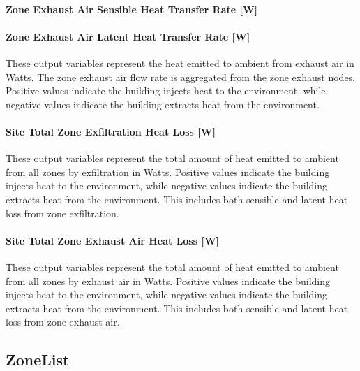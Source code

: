\paragraph{Zone Exhaust Air Sensible Heat Transfer Rate {[}W{]}}\label{zone-exhaust-sensible-heat-transfer-rate-w}

\paragraph{Zone Exhaust Air Latent Heat Transfer Rate {[}W{]}}\label{zone-exhaust-latent-heat-transfer-rate-w}

These output variables represent the heat emitted to ambient from exhaust air in Watts. The zone exhaust air flow rate is aggregated from the zone exhaust nodes. Positive values indicate the building injects heat to the environment, while negative values indicate the building extracts heat from the environment.

\paragraph{Site Total Zone Exfiltration Heat Loss {[}W{]}}\label{site-total-exfiltration-heat-transfer-rate-w}

These output variables represent the total amount of heat emitted to ambient from all zones by exfiltration in Watts. Positive values indicate the building injects heat to the environment, while negative values indicate the building extracts heat from the environment. This includes both sensible and latent heat loss from zone exfiltration.

\paragraph{Site Total Zone Exhaust Air Heat Loss {[}W{]}}\label{site-total-exhaust-heat-transfer-rate-w}

These output variables represent the total amount of heat emitted to ambient from all zones by exhaust air in Watts. Positive values indicate the building injects heat to the environment, while negative values indicate the building extracts heat from the environment. This includes both sensible and latent heat loss from zone exhaust air.

\subsection{ZoneList}\label{zonelist}

